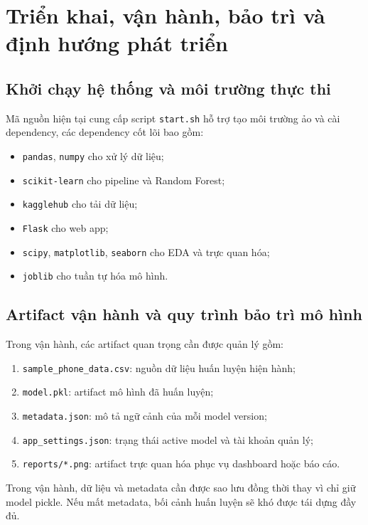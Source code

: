 \section{Triển khai, vận hành, bảo trì và định hướng phát triển}


\subsection{Khởi chạy hệ thống và môi trường thực thi}


Mã nguồn hiện tại cung cấp script \texttt{start.sh} hỗ trợ tạo môi trường ảo và cài dependency, các dependency cốt lõi bao gồm:

\begin{itemize}
    \item \texttt{pandas}, \texttt{numpy} cho xử lý dữ liệu;
    \item \texttt{scikit-learn} cho pipeline và Random Forest;
    \item \texttt{kagglehub} cho tải dữ liệu;
    \item \texttt{Flask} cho web app;
    \item \texttt{scipy}, \texttt{matplotlib}, \texttt{seaborn} cho EDA và trực quan hóa;
    \item \texttt{joblib} cho tuần tự hóa mô hình.
\end{itemize}

\subsection{Artifact vận hành và quy trình bảo trì mô hình}


Trong vận hành, các artifact quan trọng cần được quản lý gồm:

\begin{enumerate}[label=\arabic*.]
    \item \texttt{sample\_phone\_data.csv}: nguồn dữ liệu huấn luyện hiện hành;
    \item \texttt{model.pkl}: artifact mô hình đã huấn luyện;
    \item \texttt{metadata.json}: mô tả ngữ cảnh của mỗi model version;
    \item \texttt{app\_settings.json}: trạng thái active model và tài khoản quản lý;
    \item \texttt{reports/*.png}: artifact trực quan hóa phục vụ dashboard hoặc báo cáo.
\end{enumerate}

Trong vận hành, dữ liệu và metadata cần được sao lưu đồng thời thay vì chỉ giữ model pickle. Nếu mất metadata, bối cảnh huấn luyện sẽ khó được tái dựng đầy đủ.

